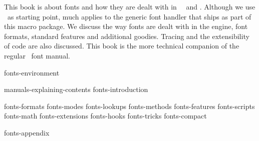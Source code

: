 
%
%

%


\enablemode[simple] %

\startbuffer[abstract]

    This book is about fonts and how they are dealt with in \CONTEXT\ \MKIV\ and
    \LUATEX. Although we use \CONTEXT\ as starting point, much applies to the
    generic font handler that ships as part of this macro package. We discuss the
    way fonts are dealt with in the engine, font formats, standard features and
    additional goodies. Tracing and the extensibility of code are also discussed.
    This book is the more technical companion of the regular \CONTEXT\ font
    manual.

\stopbuffer

\environment fonts-environment

\startdocument
  [author=Hans Hagen,
   title=Fonts out of \ConTeXt,
   subtitle=explaining luatex and mkiv,
   affiliation=PRAGMA ADE,
   comment=work in progress,
   cover:color:1=darkred,
   cover:color:2=darkgreen,
   cover:color:3=darkblue,
   cover:color:4=darkyellow,
   cover:color:5=darkgray]

    \startfrontmatter
        \component manuals-explaining-contents
        \component fonts-introduction
    \stopfrontmatter

    \startbodymatter
        \component fonts-formats
        \component fonts-modes
        \component fonts-lookups
        \component fonts-methods
        \component fonts-features
        \component fonts-scripts
        \component fonts-math
        \component fonts-extensions
        \component fonts-hooks
        \component fonts-tricks
        \component fonts-compact
    \stopbodymatter

    \startappendices
        \component fonts-appendix
    \stopappendices

\stopdocument
